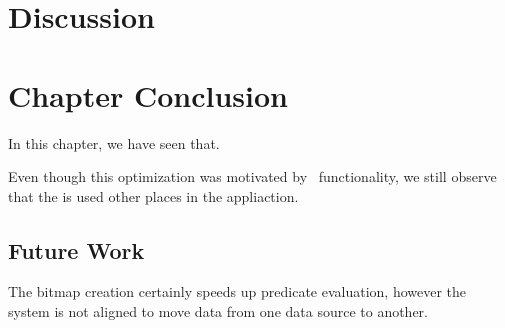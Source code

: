 \section{Discussion}
\label{sec:Discussion}

\section{Chapter Conclusion}
\label{sec:Chapter Conclusion}

In this chapter, we have seen that.

Even though this optimization was motivated by \bd~functionality, we still observe that the  is used other places in the appliaction.

\subsection{Future Work}
\label{sub:Future Work}
The bitmap creation certainly speeds up predicate evaluation, however the system is not aligned to move data from one data source to another.

